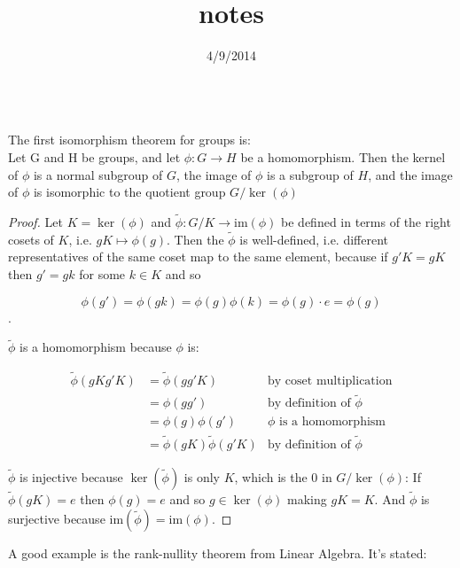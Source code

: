\documentclass[12pt]{article}
\begin{document}
 
\title{notes}
\maketitle

\date{4/9/2014}\\

The first isomorphism theorem for groups is:\\

Let G and H be groups, and let $\phi:G\rightarrow H$ be a homomorphism. Then the kernel of $\phi$ is a normal subgroup of $G$, the image of $\phi$ is a subgroup of $H$, and the image of $\phi$ is isomorphic to the quotient group $G/\ker(\phi)$ 

\begin{proof}
Let $K = \ker(\phi)$ and $\tilde{\phi}: G/K \rightarrow \text{im}(\phi)$ be defined in terms of the right cosets of $K$, i.e. $gK \mapsto \phi(g)$. Then the $\tilde{\phi}$ is well-defined, i.e. different representatives of the same coset map to the same element, because if $g'K = gK$ then $g'=gk$ for some $k \in K$ and so 

$$\phi(g') = \phi(gk) = \phi(g)\phi(k) = \phi(g)\cdot e = \phi(g)$$.

$\tilde{\phi}$ is a homomorphism because $\phi$ is:

\begin{align*}
\tilde{\phi}(gK g'K) &= \tilde{\phi}(gg'K) & \text{by coset multiplication} \\
&= \phi(gg') & \text{by definition of $\tilde{\phi}$} \\
&= \phi(g)\phi(g') & \text{$\phi$ is a homomorphism} \\
&= \tilde{\phi}(gK)\tilde{\phi}(g'K) & \text{by definition of $\tilde{\phi}$} 
\end{align*}

$\tilde{\phi}$ is injective because $\ker(\tilde{\phi})$ is only $K$, which is the 0 in $G/\ker(\phi)$: If $\tilde{\phi}(gK) = e$ then $\phi(g) = e$ and so $g \in \ker(\phi)$ making $gK = K$. And $\tilde{\phi}$ is surjective because $ \text{im}(\tilde{\phi}) = \text{im}(\phi)$.

\end{proof}

A good example is the rank-nullity theorem from Linear Algebra. It's stated:
\end{document}
